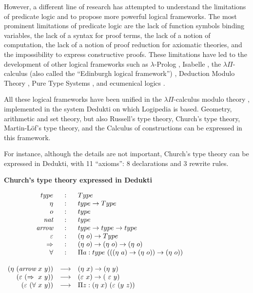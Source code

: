 However, a different line of research has attempted to understand the
limitations of predicate logic and to propose more powerful logical
frameworks.  The most prominent limitations of predicate logic are the
lack of function symbols binding variables, the lack of a syntax for
proof terms, the lack of a notion of computation, the lack of a notion
of proof reduction for axiomatic theories, and the impossibility to
express constructive proofs. These limitations have led to the
development of other logical frameworks such as $\lambda$-Prolog
\cite{NadathurMiller88, MillerNadathur12}, Isabelle \cite{Paulson90},
the $\lambda \Pi$-calculus (also called the ``Edinburgh logical
framework'') \cite{HarperHonsellPlotkin91}, Deduction Modulo Theory
\cite{DowekHardinKirchner03, DowekWerner03}, Pure Type Systems
\cite{Berardi88,Terlouw89}, and ecumenical logics
\cite{Prawitz15,Dowek15,PereiraRodriguez17}.

All these logical frameworks have been unified in the $\lambda
\Pi$-calculus modulo theory \cite{CousineauDowek07}, implemented in
the system Dedukti \cite{Assaf16} on which Logipedia is
based. Geometry, arithmetic and set theory, but also Russell's type
theory, Church's type theory, Martin-L\"of's type theory, and the
Calculus of constructions can be expressed in this framework.

For instance, although the details are not important, Church's type
theory can be expressed in Dedukti, with 11 ``axioms'': 8 declarations
and 3 rewrite rules.

\begin{framed}
\vspace{-0.5cm}
\begin{center}
{\bf \Large Church's type theory expressed in Dedukti}
\end{center}

$\begin{array}{rcl}
type&:&Type\\
\eta&:&type \rightarrow Type\\
o&:&type\\
\mbox{\it nat}&:&type\\
\mbox{\it arrow}&:&type \rightarrow type \rightarrow type\\
\varepsilon&:&(\eta~o) \rightarrow Type\\
\Rightarrow&:&(\eta~o) \rightarrow (\eta~o) \rightarrow (\eta~o)\\
\forall&:&\Pi a:type~(((\eta~a) \rightarrow (\eta~o)) \rightarrow (\eta~o))\\
\\
(\eta~(\mbox{\it arrow}~x~y)) &\longrightarrow& (\eta~x) \rightarrow (\eta~y)\\
(\varepsilon~(\Rightarrow~x~y)) &\longrightarrow& (\varepsilon~x) \rightarrow (\
\varepsilon~y)\\
(\varepsilon~(\forall~x~y)) &\longrightarrow& \Pi z:(\eta~x)~(\varepsilon~(y~z))
\end{array}$
\end{framed}


